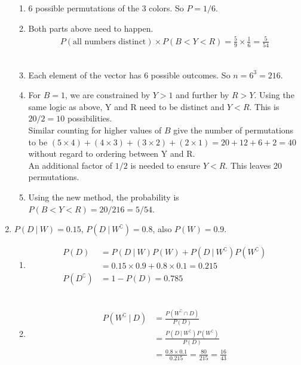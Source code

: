 \begin{enumerate}
\begin{enumerate}
			\item 6 possible permutations of the 3 colors. So $ P = 1/6 $. \\
			
			\item Both parts above need to happen. \\
			\begin{align}
				P(\text{all numbers distinct}) \times P(B<Y<R) = \frac{5}{9} \times \frac{1}{6} = \frac{5}{54}
			\end{align}\\
			
			\item Each element of the vector has 6 possible outcomes. So $ n = 6^3 = 216 $. \\
			
			\item For $ B = 1 $, we are constrained by $ Y > 1 $ and further by $ R > Y $. Using the same logic as above, Y and R need to be distinct and $ Y < R $. This is $ 20 / 2  = 10$ possibilities. \\
			
			Similar counting for higher values of $ B $ give the number of permutations to be $ (5 \times 4) + (4 \times 3) +
			(3 \times 2) + (2 \times 1)  = 20 + 12 +6 + 2 = 40 $ without regard to ordering between Y and R. \\
			
			An additional factor of $ 1/2 $ is needed to ensure $ Y < R $. This leaves 20 permutations. \\
			
			\item Using the new method, the probability is $ P(B < Y <R) =  20 / 216 = 5 / 54$. \\
		\end{enumerate}
	
	
	\item $ P(D\ |\ W) = 0.15 $, $ P(D\ |\ W^\complement) = 0.8 $, also $ P(W) = 0.9 $.
	\begin{enumerate}
		\item 
			\begin{align}
				P(D) &= P(D\ |\ W)P(W) + P(D\ |\ W^\complement)P(W^\complement) \\
				&= 0.15 \times 0.9 + 0.8 \times 0.1 = 0.215 \\
				P(D^\complement) &= 1 - P(D) = 0.785
			\end{align} \\
		
		
		\item 
			\begin{align}
				P(W^\complement\ |\ D) &= \frac{P(W^\complement \cap D)}{P(D)} \\
				&= \frac{P(D\ |\ W^\complement) P(W^\complement)}{P(D)} \\
				&= \frac{0.8 \times 0.1}{0.215} = \frac{80}{215} = \frac{16}{43}
			\end{align} \\
		

\end{enumerate}
\end{enumerate}
